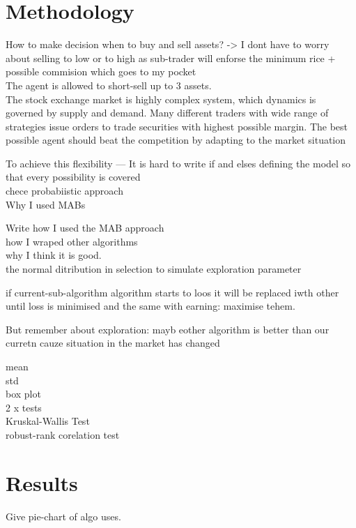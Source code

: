 \documentclass{llncs}
\begin{document}
\section{Methodology}
How to make decision when to buy and sell assets? -> I dont have to worry about selling to low or to high as sub-trader will enforse the minimum rice + possible commision which goes to my pocket\\

The agent is allowed to short-sell up to 3 assets.\\

The stock exchange market is highly complex system, which dynamics is governed by supply and demand. Many different traders with wide range of strategies issue orders to trade securities with highest possible margin. The best possible agent should beat the competition by adapting to the market situation

To achieve this flexibility --- It is hard to write if and elses defining the model so that every possibility is covered\\
chece probabiistic approach\\




Why I used MABs

Write how I used the MAB approach\\
  how I wraped other algorithms\\
  why I think it is good.\\

the normal ditribution in selection to simulate exploration parameter


if current-sub-algorithm algorithm starts to loos it will be replaced iwth other until loss is minimised and the same with earning: maximise tehem.

But remember about exploration: mayb eother algorithm is better than our curretn cauze situation in the market has changed


mean\\
std\\
box plot\\
2 x tests\\

Kruskal-Wallis Test\\
robust-rank corelation test


\section{Results}
Give pie-chart of algo uses.\\
\end{document}
